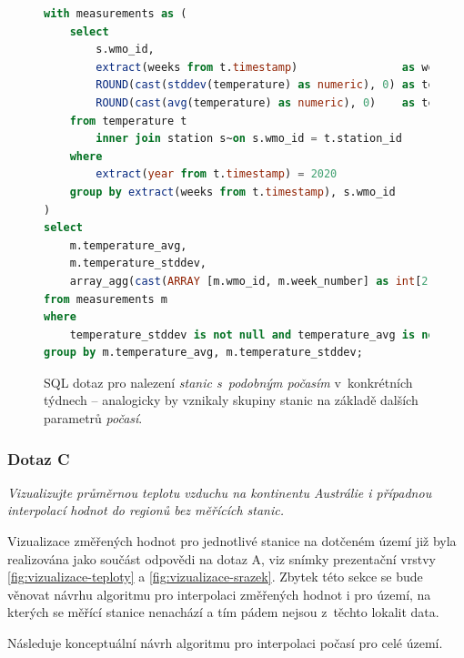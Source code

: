 \documentclass[10pt,a4paper,titlepage]{extarticle}
\begin{document}
\begin{figure}[H]
    \begin{lstlisting}[language=SQL]
with measurements as (
    select
        s.wmo_id,
        extract(weeks from t.timestamp)                as week_number,
        ROUND(cast(stddev(temperature) as numeric), 0) as temperature_stddev,
        ROUND(cast(avg(temperature) as numeric), 0)    as temperature_avg
    from temperature t
        inner join station s~on s.wmo_id = t.station_id
    where
        extract(year from t.timestamp) = 2020
    group by extract(weeks from t.timestamp), s.wmo_id
)
select
    m.temperature_avg,
    m.temperature_stddev,
    array_agg(cast(ARRAY [m.wmo_id, m.week_number] as int[2])) as stations_in_time
from measurements m
where
    temperature_stddev is not null and temperature_avg is not null
group by m.temperature_avg, m.temperature_stddev;
    \end{lstlisting}
    \caption{SQL dotaz pro nalezení \emph{stanic s~podobným počasím} v~konkrétních týdnech -- analogicky by vznikaly
    skupiny stanic na základě dalších parametrů \emph{počasí}.}
    \label{lst:sql-dotaz-b}
\end{figure}

    \subsubsection{Dotaz C}

    \emph{Vizualizujte průměrnou teplotu vzduchu na kontinentu Austrálie i případnou interpolací hodnot do regionů
    bez měřících stanic.}

    Vizualizace změřených hodnot pro jednotlivé stanice na dotčeném území již byla realizována jako součást odpovědi
    na dotaz A, viz snímky prezentační vrstvy \ref{fig:vizualizace-teploty} a \ref{fig:vizualizace-srazek}. Zbytek
    této sekce se bude věnovat návrhu algoritmu pro interpolaci změřených hodnot i pro území, na kterých se měřící
    stanice nenachází a tím pádem nejsou z~těchto lokalit data.

    Následuje konceptuální návrh algoritmu pro interpolaci počasí pro celé území.
    
\end{document}
